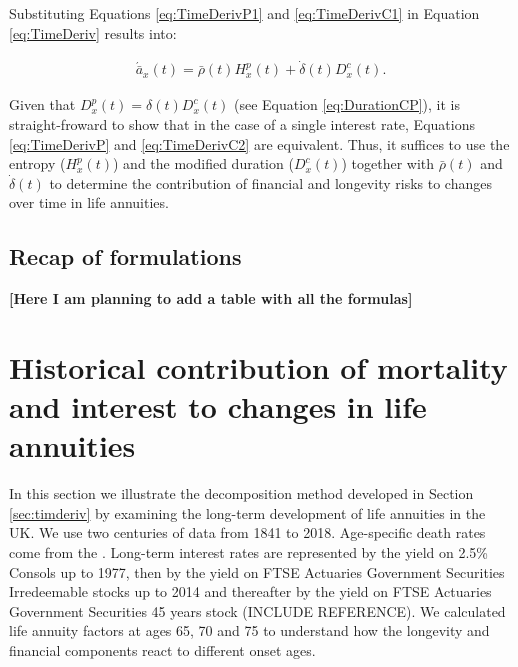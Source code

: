 \documentclass[12pt]{article}
\begin{document}
Substituting Equations \ref{eq:TimeDerivP1} and \ref{eq:TimeDerivC1} in Equation \ref{eq:TimeDeriv} results into: 


\begin{equation}\label{eq:TimeDerivC2}
\begin{split}
\acute{\bar{a}}_x(t) =  \bar{\rho}(t){H}^{p}_x(t)+\dot{\delta}(t)  D^{c}_x(t).
\end{split}
\end{equation}



Given that ${D}^{p}_{x}(t)=\delta(t){D}^{c}_{x}(t)$ (see Equation \ref{eq:DurationCP}), it is straight-froward to show that in the case of a single interest rate, Equations \ref{eq:TimeDerivP}  and \ref{eq:TimeDerivC2} are equivalent. Thus, it suffices to use the entropy (${H}^{p}_x(t)$) and the modified duration ($D^{c}_x(t)$) together with $\bar{\rho}(t)$ and $\dot{\delta}(t)$ to determine the contribution of financial and longevity risks to changes over time in life annuities.





\subsection{Recap of formulations}




\textbf{[Here I am planning to add a table with all the formulas]}

\section{Historical contribution of mortality and interest to changes in life annuities}



In this section we illustrate the decomposition method developed in Section \ref{sec:timderiv} by examining the long-term development of life annuities in the UK. We use two centuries of data from 1841 to 2018. Age-specific death rates come from the \citep{HMD2020}. Long-term interest rates are represented by the yield on 2.5\% Consols up to 1977, then by the yield on FTSE Actuaries Government Securities Irredeemable stocks up to 2014 and thereafter by the yield on FTSE Actuaries Government Securities 45 years stock (INCLUDE REFERENCE). We calculated life annuity factors at ages 65, 70 and 75 to understand how the longevity and financial components react to different onset ages.
\end{document}
